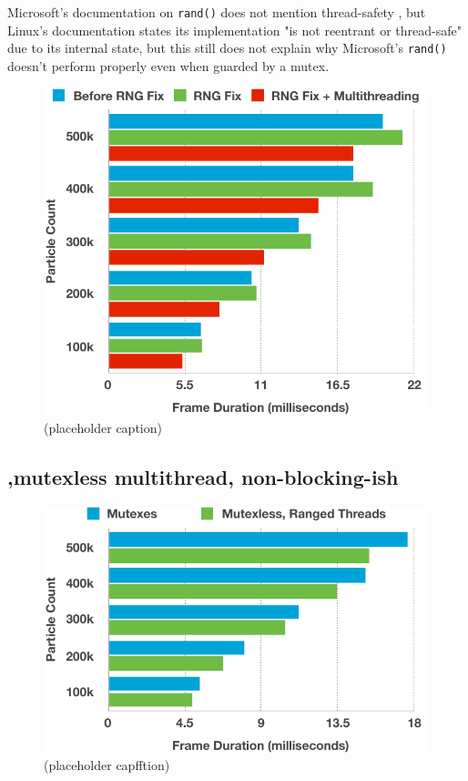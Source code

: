 \documentclass[11pt, a4paper, twocolumn]{article}
\begin{document}
Microsoft's documentation on \verb|rand()| does not mention thread-safety \citep{CLibRandMicrosoft}, but Linux's documentation states its implementation "is not reentrant or thread-safe" \citep{CLibRandLinux} due to its internal state, but this still does not explain why Microsoft's \verb|rand()| doesn't perform properly even when guarded by a mutex.

\begin{figure}[h]
\includegraphics[width=\linewidth]{initial-rng-multithread}
\caption{(placeholder caption)}
\label{fig:initial-rng-multithread}
\end{figure}

\subsection{,mutexless multithread, non-blocking-ish}

\lipsum[1-1]

\begin{figure}[h]
\includegraphics[width=\linewidth]{mutexes-rangedthreads}
\caption{(placeholder capfftion)}
\label{fig:mutexes-rangedthreads}
\end{figure}
\end{document}
